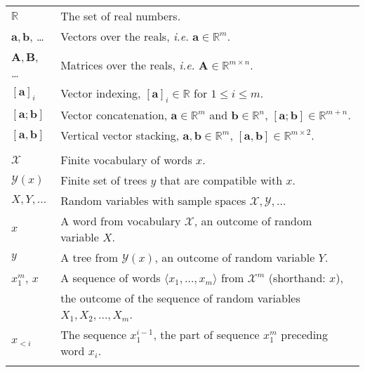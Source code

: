 \documentclass[11pt]{article}
\begin{document}
\begin{table}[h]
\center

  \begin{tabular}{l|l}
    \hline\hline
    $\mathbb{R}$  & The set of real numbers.   \\
    $\mathbf{a}, \mathbf{b}$, \dots  & Vectors over the reals, \textit{i.e.} $\mathbf{a} \in \mathbb{R}^m$.  \\
    $\mathbf{A}, \mathbf{B}$, \dots & Matrices over the reals, \textit{i.e.} $\mathbf{A} \in \mathbb{R}^{m \times n}$.   \\
    $[\mathbf{a}]_i$ & Vector indexing, $[\mathbf{a}]_i \in \mathbb{R}$ for $1 \leq i \leq m$. \\
    $[\mathbf{a}; \mathbf{b}]$ & Vector concatenation, $\mathbf{a} \in \mathbb{R}^{m}$ and $\mathbf{b} \in \mathbb{R}^{n}$, $[\mathbf{a}; \mathbf{b}] \in \mathbb{R}^{m+n}$.  \\
    $[\mathbf{a}, \mathbf{b}]$  & Vertical vector stacking, $\mathbf{a}, \mathbf{b} \in \mathbb{R}^{m}$, $[\mathbf{a}, \mathbf{b}] \in \mathbb{R}^{m \times 2}$.  \\
    & \\

    $\mathcal{X}$ & Finite vocabulary of words $x$. \\
    $\mathcal{Y}(x)$ & Finite set of trees $y$ that are compatible with $x$.  \\
    $X, Y, \dots$ & Random variables with sample spaces $\mathcal{X}, \mathcal{Y}, \dots$  \\
    $x$ & A word from vocabulary $\mathcal{X}$, an outcome of random variable $X$.   \\
    $y$ & A tree from $\mathcal{Y}(x)$, an outcome of random variable $Y$.  \\
    $x_1^m$, $x$ & A sequence of words $\langle x_1, \dots, x_m \rangle$ from $\mathcal{X}^m$ (shorthand: $x$), \\ & the outcome of the sequence of random variables $X_1, X_2, \dots, X_m$.   \\
    $x_{<i}$ & The sequence $x_{1}^{i-1}$, the part of sequence $x_1^m$ preceding word $x_i$.  \\
    & \\



\end{tabular}
\end{table}
\end{document}
